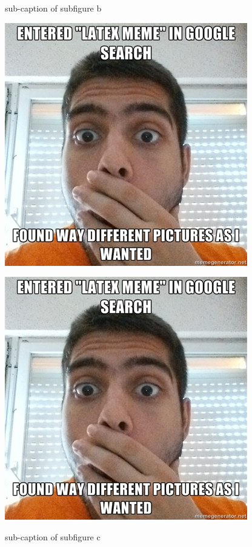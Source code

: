 \documentclass{article}
\begin{document}
\begin{landscape}
\begin{figure}[h]
{\begin{subfloatrow}[3]
        \ffigbox
        {
         \caption{sub-caption of subfigure b}
         \label{subfig2}
        }
        {\includegraphics[width=\linewidth]{./img/67972605}}
        
        \ffigbox
        {
         \caption{sub-caption of subfigure c}
         \label{subfig1}
        }
        {\includegraphics[width=\linewidth]{./img/67972605}}
    \end{subfloatrow}
    
}
\end{figure}
\end{landscape}
\end{document}
